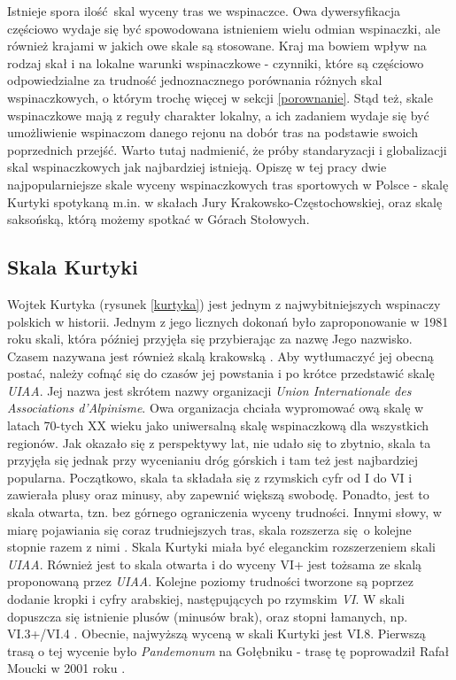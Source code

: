 \documentclass{article}
\begin{document}
Istnieje spora ilość skal wyceny tras we wspinaczce. Owa dywersyfikacja częściowo wydaje się być spowodowana istnieniem wielu odmian wspinaczki, ale również krajami w jakich owe skale są stosowane. Kraj ma bowiem wpływ na rodzaj skał i na lokalne warunki wspinaczkowe - czynniki, które są częściowo odpowiedzialne za trudność jednoznacznego porównania różnych skal wspinaczkowych, o którym trochę więcej w sekcji \ref{porownanie}. Stąd też, skale wspinaczkowe mają z reguły charakter lokalny, a ich zadaniem wydaje się być umożliwienie wspinaczom danego rejonu na dobór tras na podstawie swoich poprzednich przejść. Warto tutaj nadmienić, że próby standaryzacji i globalizacji skal wspinaczkowych jak najbardziej istnieją. Opiszę w tej pracy dwie najpopularniejsze skale wyceny wspinaczkowych tras sportowych w Polsce - skalę Kurtyki spotykaną m.in. w skałach Jury Krakowsko-Częstochowskiej, oraz skalę saksońską, którą możemy spotkać w Górach Stołowych.

\subsection{Skala Kurtyki}
\label{skala-kurtyki}
Wojtek Kurtyka (rysunek \ref{kurtyka}) jest jednym z najwybitniejszych wspinaczy polskich w historii. Jednym z jego licznych dokonań było zaproponowanie w 1981 roku skali, która później przyjęła się przybierając za nazwę Jego nazwisko. Czasem nazywana jest również skalą krakowską \cite{wiki-skale}. Aby wytłumaczyć jej obecną postać, należy cofnąć się do czasów jej powstania i po krótce przedstawić skalę \textit{UIAA}. Jej nazwa jest skrótem nazwy organizacji \textit{Union Internationale des Associations d'Alpinisme}. Owa organizacja chciała wypromować ową skalę w latach 70-tych XX wieku jako uniwersalną skalę wspinaczkową dla wszystkich regionów. Jak okazało się z perspektywy lat, nie udało się to zbytnio, skala ta przyjęła się jednak przy wycenianiu dróg górskich i tam też jest najbardziej popularna. Początkowo, skala ta składała się z rzymskich cyfr od I do VI i zawierała plusy oraz minusy, aby zapewnić większą swobodę. Ponadto, jest to skala otwarta, tzn. bez górnego ograniczenia wyceny trudności. Innymi słowy, w miarę pojawiania się coraz trudniejszych tras, skala rozszerza się o kolejne stopnie razem z nimi \cite{uiaa-skala}\cite{skalnik-skale}. Skala Kurtyki miała być eleganckim rozszerzeniem skali \textit{UIAA}. Również jest to skala otwarta i do wyceny VI+ jest tożsama ze skalą proponowaną przez \textit{UIAA}. Kolejne poziomy trudności tworzone są poprzez dodanie kropki i cyfry arabskiej, następujących po rzymskim \textit{VI}. W skali dopuszcza się istnienie plusów (minusów brak), oraz stopni łamanych, np. VI.3+/VI.4 \cite{drytooling-skale}. Obecnie, najwyższą wyceną w skali Kurtyki jest VI.8. Pierwszą trasą o tej wycenie było \textit{Pandemonum} na Gołębniku - trasę tę poprowadził Rafał Moucki w 2001 roku \cite{VI8}.
\end{document}
